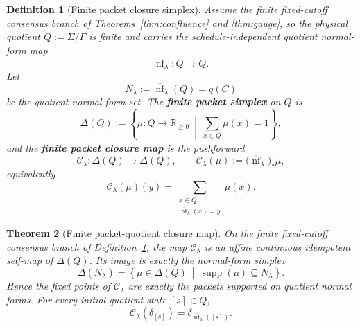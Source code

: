 \documentclass[11pt]{article}
\newtheorem{theorem}{Theorem}[section]
\newtheorem{definition}[theorem]{Definition}
\theoremstyle{remark}
\theoremstyle{plain}
\begin{document}
\begin{definition}[Finite packet closure simplex]\label{def:packet-closure-simplex}
Assume the finite fixed-cutoff consensus branch of Theorems~\ref{thm:confluence} and
\ref{thm:gauge}, so the physical quotient \(Q:=\Sigma/\Gamma\) is finite and carries the
schedule-independent quotient normal-form map
\[
\overline{\operatorname{nf}}_\lambda:Q\to Q.
\]
Let
\[
N_\lambda:=\overline{\operatorname{nf}}_\lambda(Q)=q(C)
\]
be the quotient normal-form set. The \textbf{finite packet simplex} on \(Q\) is
\[
\Delta(Q):=
\left\{
\mu:Q\to\mathbb R_{\ge0}\ \middle|\ \sum_{x\in Q}\mu(x)=1
\right\},
\]
and the \textbf{finite packet closure map} is the pushforward
\[
\mathcal C_\lambda:\Delta(Q)\to\Delta(Q),
\qquad
\mathcal C_\lambda(\mu):=
\bigl(\overline{\operatorname{nf}}_\lambda\bigr)_*\mu,
\]
equivalently
\[
\mathcal C_\lambda(\mu)(y)
=
\sum_{\substack{x\in Q\\ \overline{\operatorname{nf}}_\lambda(x)=y}}\mu(x).
\]
\end{definition}

\begin{theorem}[Finite packet-quotient closure map]\label{thm:finite-packet-closure}
On the finite fixed-cutoff consensus branch of Definition~\ref{def:packet-closure-simplex}, the
map \(\mathcal C_\lambda\) is an affine continuous idempotent self-map of \(\Delta(Q)\). Its
image is exactly the normal-form simplex
\[
\Delta(N_\lambda)
=
\left\{
\mu\in\Delta(Q)\ \middle|\ \operatorname{supp}(\mu)\subseteq N_\lambda
\right\}.
\]
Hence the fixed points of \(\mathcal C_\lambda\) are exactly the packets supported on quotient
normal forms. For every initial quotient state \([s]\in Q\),
\[
\mathcal C_\lambda(\delta_{[s]})
=
\delta_{\overline{\operatorname{nf}}_\lambda([s])}.
\]
\end{theorem}
\end{document}
